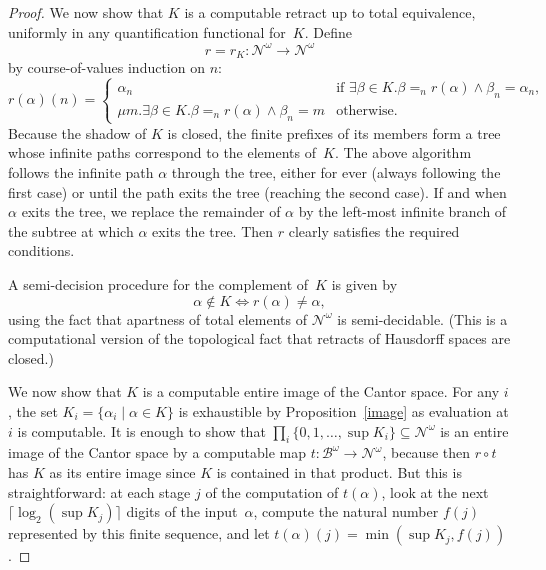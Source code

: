 \documentclass{LMCS}
\newcommand{\myomega}{\omega}
\newcommand{\pN}{\mathcal{N}}
\newcommand{\pBool}{\mathcal{B}}
\newcommand{\comp}{\circ}
\begin{document}
\begin{proof}
\medskip

We now show that $K$ is a computable retract up to total equivalence,
uniformly in any quantification functional for~$K$.  Define \[ r = r_K
\colon \pN^\myomega \to \pN^\myomega\] by course-of-values induction
on $n$:
\[
 r(\alpha)(n) = 
 \begin{cases}
   \alpha_n & \text{if $\exists \beta \in K. \beta =_n r(\alpha) \wedge \beta_n = \alpha_n$,} \\
   \mu m. \exists \beta \in K. \beta =_n r(\alpha) \wedge
     \beta_n = m & \text{otherwise.}
 \end{cases}
\]
Because the shadow of $K$ is closed, the finite prefixes of its
members form a tree whose infinite paths correspond to the elements
of~$K$. 
The above algorithm follows the infinite path $\alpha$ through the
tree, either for ever (always following the first case) or until the
path exits the tree (reaching the second case). If and when $\alpha$
exits the tree, we replace the remainder of $\alpha$ by the left-most
infinite branch of the subtree at which $\alpha$ exits the tree. Then
$r$ clearly satisfies the required conditions.  

\medskip

A semi-decision procedure for the complement of~$K$ is given by
\[
\alpha \not\in K \iff r(\alpha) \ne \alpha,
\]
using the fact that apartness of total elements of $\pN^\myomega$ is
semi-decidable.
(This is a computational version of the topological fact
that retracts of Hausdorff spaces are closed.) 

\medskip

We now show that $K$ is a computable entire image of the Cantor space.
For any $i$, the set $K_i = \{ \alpha_i \mid \alpha \in K \}$ is
exhaustible by Proposition~\ref{image} as evaluation at $i$ is
computable. It is enough to show that $\prod_i
\{0,1,\dots,\sup K_i\} \subseteq \pN^\myomega$ is an entire image of the
Cantor space by a computable map $t \colon \pBool^\myomega \to
\pN^\myomega$, because then $r \comp t$ has $K$ as its entire image
since $K$ is contained in that product. But this is straightforward:
at each stage $j$ of the computation of $t(\alpha)$, look at the next
$\lceil \log_2(\sup K_j) \rceil$ digits of the input~$\alpha$,
compute the natural
number $f(j)$ represented by this finite sequence, and let
$t(\alpha)(j)=\min(\sup K_j,f(j))$.

\medskip


\end{proof}
\end{document}
